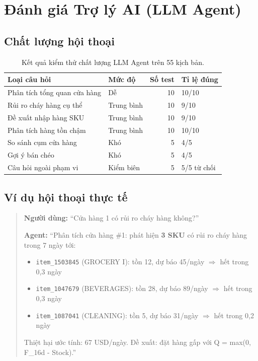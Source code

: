 \documentclass[12pt,a4paper]{report}
\begin{document}
\section{Đánh giá Trợ lý AI (LLM Agent)}

\subsection{Chất lượng hội thoại}

\begin{table}[H]
\centering
\small
\begin{tabular}{@{}llrl@{}}
\toprule
\textbf{Loại câu hỏi} & \textbf{Mức độ} & \textbf{Số test} & \textbf{Tỉ lệ đúng} \\
\midrule
Phân tích tổng quan cửa hàng & Dễ & 10 & 10/10 \\
Rủi ro cháy hàng cụ thể & Trung bình & 10 & 9/10 \\
Đề xuất nhập hàng SKU & Trung bình & 10 & 9/10 \\
Phân tích hàng tồn chậm & Trung bình & 10 & 10/10 \\
So sánh cụm cửa hàng & Khó & 5 & 4/5 \\
Gợi ý bán chéo & Khó & 5 & 4/5 \\
Câu hỏi ngoài phạm vi & Kiểm biên & 5 & 5/5 từ chối \\
\bottomrule
\end{tabular}
\caption{Kết quả kiểm thử chất lượng LLM Agent trên 55 kịch bản.}
\label{tab:llmtest}
\end{table}

\subsection{Ví dụ hội thoại thực tế}

\begin{quote}
\textbf{Người dùng:} ``Cửa hàng 1 có rủi ro cháy hàng không?''

\textbf{Agent:} ``Phân tích cửa hàng \#1: phát hiện \textbf{3 SKU} có rủi ro cháy hàng trong 7 ngày tới:
\begin{itemize}
    \item \texttt{item\_1503845} (GROCERY I): tồn 12, dự báo 45/ngày $\Rightarrow$ hết trong 0,3 ngày
    \item \texttt{item\_1047679} (BEVERAGES): tồn 28, dự báo 89/ngày $\Rightarrow$ hết trong 0,3 ngày
    \item \texttt{item\_1087041} (CLEANING): tồn 5, dự báo 31/ngày $\Rightarrow$ hết trong 0,2 ngày
\end{itemize}
Thiệt hại ước tính: 67 USD/ngày. Đề xuất: đặt hàng gấp với Q = max(0, F\_16d - Stock).''
\end{quote}
\end{document}
